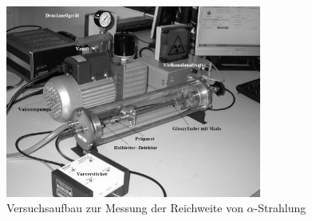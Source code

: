 \begin{figure}[h]
  \centering
  \label{fig:Versuchsaufbau}
  \includegraphics[width=0.75\textwidth]{Grafiken/V701_Versuchsaufbau_sw.jpg}
  \caption{Versuchsaufbau zur Messung der Reichweite von $\alpha$-Strahlung \cite{V701}}
\end{figure}
